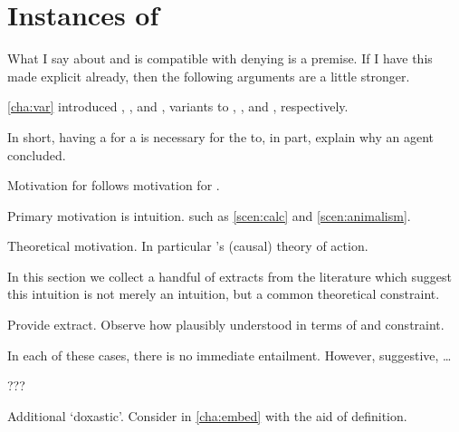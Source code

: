 \chapter{Instances of \issueConstraint{}}
\label{cha:lit}

\begin{note}
  \color{red}
  What I say about \agpe{} and \ros{} is compatible with denying \ros{} is a premise.
  If I have this made explicit already, then the following arguments are a little stronger.
\end{note}

\begin{note}
  \autoref{cha:var} introduced \qWhyV{}, \qHowV{}, and \issueConstraint{}, variants to \qWhy{}, \qHow{}, and \issueInclusion{}, respectively.

  In short, having a  for a \ros{} is necessary for the \ros{} to, in part, explain why an agent concluded.

  Motivation for \issueConstraint{} follows motivation for \issueInclusion{}.

  Primary motivation is intuition.
   such as \autoref{scen:calc} and \autoref{scen:animalism}.
  
  Theoretical motivation.
  In particular \citeauthor{Davidson:1963aa}'s (causal) theory of action.
\end{note}

\begin{note}
  In this section we collect a handful of extracts from the literature which suggest this intuition is not merely an intuition, but a common theoretical constraint.

  Provide extract.
  Observe how plausibly understood in terms of \wit{} and constraint.

  In each of these cases, there is no immediate entailment.
  However, suggestive, \dots
\end{note}

\begin{note}
  \begin{TOCEnum}
  \item
    ???
  \end{TOCEnum}
\end{note}

\begin{note}
  Additional `doxastic'.
  Consider in \autoref{cha:embed} with the aid of definition.
\end{note}

\newpage


